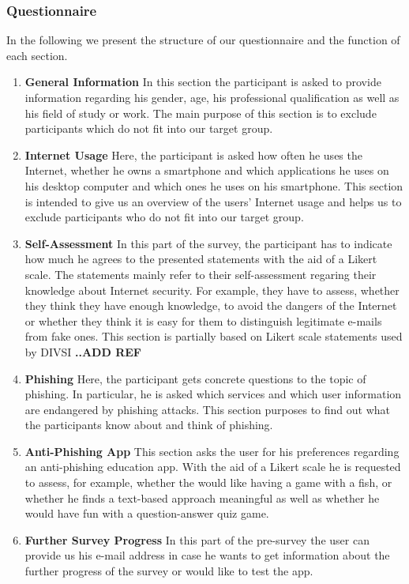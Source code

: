 \subsubsection{Questionnaire}
In the following we present the structure of our questionnaire and the function of each section. 
\begin{enumerate}
	\item \textbf{General Information} In this section the participant is asked to provide information regarding his gender, age, his professional qualification as well as his field of study or work. The main purpose of this section is to exclude participants which do not fit into our target group.
	\item \textbf{Internet Usage} Here, the participant is asked how often he uses the Internet, whether he owns a smartphone and which applications he uses on his desktop computer and which ones he uses on his smartphone. This section is intended to give us an overview of the users' Internet usage and helps us to exclude participants who do not fit into our target group.
	\item \textbf{Self-Assessment} In this part of the survey, the participant has to indicate how much he agrees to the presented statements with the aid of a Likert scale. The statements mainly refer to their self-assessment regaring their knowledge about Internet security. For example, they have to assess, whether they think they have enough knowledge, to avoid the dangers of the Internet or whether they think it is easy for them to distinguish legitimate e-mails from fake ones. This section is partially based on Likert scale statements used by DIVSI \textbf{..ADD REF}
	\item \textbf{Phishing} Here, the participant gets concrete questions to the topic of phishing. In particular, he is asked which services and which user information are endangered by phishing attacks. This section purposes to find out what the participants know about and think of phishing.
	\item \textbf{Anti-Phishing App} This section asks the user for his preferences regarding an anti-phishing education app. With the aid of a Likert scale he is requested to assess, for example, whether the would like having a game with a fish, or whether he finds a text-based approach meaningful as well as whether he would have fun with a question-answer quiz game.
	\item \textbf{Further Survey Progress} In this part of the pre-survey the user can provide us his e-mail address in case he wants to get information about the further progress of the survey or would like to test the app.
\end{enumerate}

